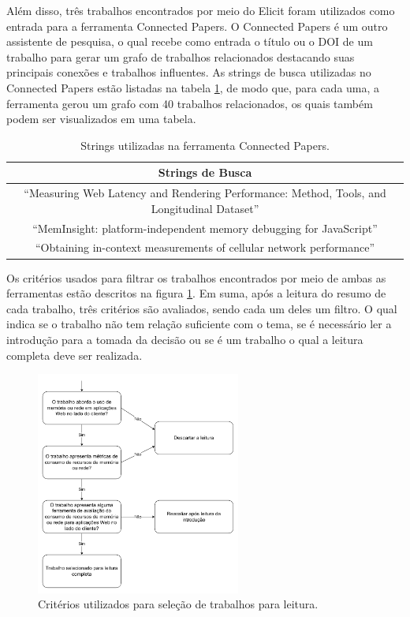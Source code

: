 \documentclass[12pt]{tcc}
\begin{document}
Além disso, três trabalhos encontrados por meio do Elicit foram utilizados como entrada para a ferramenta Connected Papers.
O Connected Papers é um outro assistente de pesquisa, o qual recebe como entrada o título ou o DOI de um trabalho para gerar um grafo de trabalhos relacionados destacando suas principais conexões e trabalhos influentes.
As strings de busca utilizadas no Connected Papers estão listadas na tabela \ref{tab:strings-connected-papers}, de modo que, para cada uma, a ferramenta gerou um grafo com 40 trabalhos relacionados, os quais também podem ser visualizados em uma tabela. \\

\begin{table}[h!]
\centering

\caption{Strings utilizadas na ferramenta Connected Papers.}
\begin{tabular}{||c||} 

\hline
	Strings de Busca \\
\hline\hline
``Measuring Web Latency and Rendering Performance: Method, Tools, and Longitudinal Dataset''\\
``MemInsight: platform-independent memory debugging for JavaScript''\\
``Obtaining in-context measurements of cellular network performance''\\
\hline
\end{tabular}
\label{tab:strings-connected-papers}
\end{table}

Os critérios usados para filtrar os trabalhos encontrados por meio de ambas as ferramentas estão descritos na figura \ref{fig:fluxo-leitura}.
Em suma, após a leitura do resumo de cada trabalho, três critérios são avaliados, sendo cada um deles um filtro.
O qual indica se o trabalho não tem relação suficiente com o tema, se é necessário ler a introdução para a tomada da decisão ou se é um trabalho o qual a leitura completa deve ser realizada.

\begin{figure}[!ht]
	\centering
	\includegraphics[width=0.6\textwidth]{figures/fluxo-decisao-leitura.pdf}
	\caption{Critérios utilizados para seleção de trabalhos para leitura.}
	\label{fig:fluxo-leitura}
\end{figure}
\end{document}
